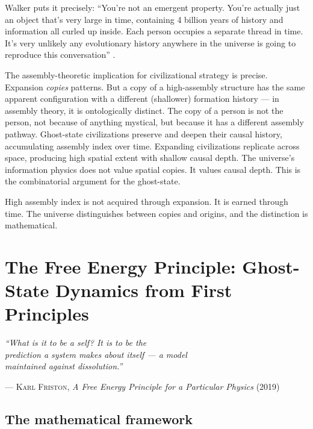 \documentclass[12pt, a4paper]{article}
\begin{document}
Walker puts it precisely: ``You're not an emergent property. You're actually just an object
that's very large in time, containing 4 billion years of history and information all curled
up inside. Each person occupies a separate thread in time. It's very unlikely any
evolutionary history anywhere in the universe is going to reproduce this conversation''
\citep{walker2024}.

The assembly-theoretic implication for civilizational strategy is precise. Expansion
\textit{copies} patterns. But a copy of a high-assembly structure has the same apparent
configuration with a different (shallower) formation history --- in assembly theory, it is
ontologically distinct. The copy of a person is not the person, not because of anything
mystical, but because it has a different assembly pathway. Ghost-state civilizations preserve
and deepen their causal history, accumulating assembly index over time. Expanding
civilizations replicate across space, producing high spatial extent with shallow causal
depth. The universe's information physics does not value spatial copies. It values causal
depth. This is the combinatorial argument for the ghost-state.

\begin{pullquote}
High assembly index is not acquired through expansion. It is earned through time. The universe
distinguishes between copies and origins, and the distinction is mathematical.
\end{pullquote}

\section{The Free Energy Principle: Ghost-State Dynamics from First Principles}

\epigraph{
  \textit{``What is it to be a self? It is to be the\\
  prediction a system makes about itself --- a model\\
  maintained against dissolution.''}
}{--- \textsc{Karl Friston,} \textit{A Free Energy Principle for a Particular Physics} (2019)}

\subsection{The mathematical framework}
\end{document}
